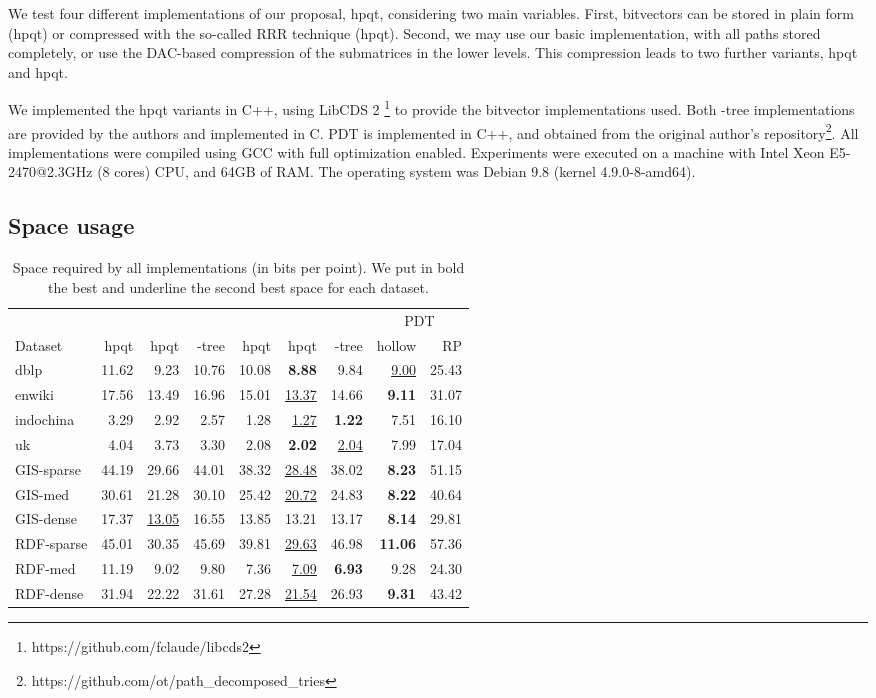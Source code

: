\documentclass{elsarticle}
\newcommand{\kt}{-tree\xspace}
\newcommand{\ktplain}{-tree\xspace}
\newcommand{\dblp}{\textsf{dblp}\xspace}
\newcommand{\enwiki}{\textsf{enwiki}\xspace}
\newcommand{\indo}{\textsf{indochina}\xspace}
\newcommand{\uk}{\textsf{uk}\xspace}
\newcommand{\giss}{\textsf{GIS-sparse}\xspace}
\newcommand{\gism}{\textsf{GIS-med}\xspace}
\newcommand{\gisd}{\textsf{GIS-dense}\xspace}
\newcommand{\rdfs}{\textsf{RDF-sparse}\xspace}
\newcommand{\rdfm}{\textsf{RDF-med}\xspace}
\newcommand{\rdfd}{\textsf{RDF-dense}\xspace}
\newcommand{\hpqt}{\textsf{hpqt}\xspace}
\newcommand{\hpqtp}{\textsf{hpqt}\xspace}
\newcommand{\hpqtR}{\textsf{hpqt}\xspace}
\newcommand{\hpqtpdac}{\textsf{hpqt}\xspace}
\newcommand{\hpqtRdac}{\textsf{hpqt}\xspace}
\newcommand{\pdt}{PDT\xspace}
\begin{document}
We test four different implementations of our proposal, \hpqt, considering two main variables. First, bitvectors  can be stored in plain form (\hpqtp) or compressed with the so-called RRR technique \cite{RRR} (\hpqtR). Second, we may use our basic implementation, with all  paths stored completely, or use the DAC-based compression of the submatrices in the lower levels. This compression leads to two further variants, \hpqtpdac and \hpqtRdac.

We implemented the \hpqt variants in C++, using LibCDS 2 \footnote{https://github.com/fclaude/libcds2} to provide the bitvector implementations used. Both \kt implementations are provided by the authors and implemented in C. PDT is implemented in C++, and obtained from the original author's repository\footnote{https://github.com/ot/path\_decomposed\_tries}. All implementations were compiled using GCC with full optimization enabled. Experiments were executed on a machine with Intel Xeon E5-2470@2.3GHz (8 cores) CPU, and 64GB of RAM. The operating system was Debian 9.8 (kernel 4.9.0-8-amd64).

\subsection{Space usage}

\begin{table}
\footnotesize
\centering
\begin{tabular}{ l | r r r | r r r  | r r}
 & & & & \multicolumn{3}{|c|}{} & \multicolumn{2}{c}{\pdt} \\
Dataset & \hpqtp & \hpqtR & \ktplain & \hpqtp & \hpqtR & \kt & hollow & RP \\
\hline
\dblp	& 11.62	& 9.23	& 10.76	& 10.08	& \textbf{8.88}	& 9.84 & \underline{9.00} & 25.43\\
\enwiki	& 17.56	& 13.49	& 16.96	& 15.01	& \underline{13.37}	& 14.66 & \textbf{9.11} & 31.07\\
\hline
\indo	& 3.29	& 2.92	& 2.57	& 1.28	& \underline{1.27}	& \textbf{1.22} & 7.51 & 16.10 \\
\uk	    & 4.04	& 3.73	& 3.30	& 2.08	& \textbf{2.02}	& \underline{2.04} & 7.99 & 17.04\\
\hline
\giss	& 44.19	& 29.66	& 44.01	& 38.32	& \underline{28.48}	& 38.02 & \textbf{8.23} & 51.15\\
\gism	& 30.61	& 21.28	& 30.10	& 25.42	& \underline{20.72}	& 24.83 & \textbf{8.22} & 40.64\\
\gisd	& 17.37	& \underline{13.05}	& 16.55	& 13.85	& 13.21	& 13.17 &\textbf{ 8.14} & 29.81 \\
\hline
\rdfs	& 45.01	& 30.35	& 45.69	& 39.81	& \underline{29.63}	& 46.98 & \textbf{11.06} & 57.36 \\
\rdfm	& 11.19	& 9.02	& 9.80	& 7.36	& \underline{7.09}	& \textbf{6.93} & 9.28 & 24.30 \\
\rdfd	& 31.94	& 22.22	& 31.61	& 27.28	& \underline{21.54}	& 26.93 & \textbf{9.31} & 43.42 \\
\hline
\end{tabular}
\caption{Space required by all implementations (in bits per point). We put in bold the best and underline the second best space for each dataset.}
\label{tab:space}
\end{table}
\end{document}
